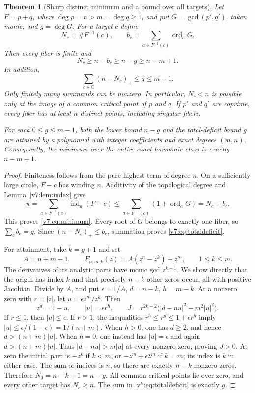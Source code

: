 \documentclass[UTF8,11pt]{ctexart}
\newtheorem{thm}{Theorem}[section]
\theoremstyle{definition}
\numberwithin{equation}{section}
\newcommand{\C}{\mathbb C}\newcommand{\R}{\mathbb R}
\DeclareMathOperator{\ord}{ord}\DeclareMathOperator{\Fix}{Fix}
\begin{document}
\begin{thm}[Sharp distinct minimum and a bound over all targets]
\label{v7:thm:minimum}
Let $F=p+\overline q$, where $\deg p=n>m=\deg q\ge1$, and put
$G=\gcd(p',q')$, taken monic, and $g=\deg G$. For a target $c$ define
\[
 N_c=\#F^{-1}(c),\qquad
 b_c=\sum_{a\in F^{-1}(c)}\ord_aG.
\]
Then every fiber is finite and
\begin{equation}\label{v7:eq:minimum}
 N_c\ge n-b_c\ge n-g\ge n-m+1.
\end{equation}
In addition,
\begin{equation}\label{v7:eq:totaldeficit}
 \sum_{c\in\C}(n-N_c)_+\le g\le m-1.
\end{equation}
Only finitely many summands can be nonzero. In particular,
$N_c<n$ is possible only at the image of a common critical point
of $p$ and $q$. If $p'$ and $q'$ are coprime, every fiber has
at least $n$ distinct points, including singular fibers.

For each $0\le g\le m-1$, both the lower bound $n-g$ and the
total-deficit bound $g$ are attained by a polynomial with integer
coefficients and exact degrees $(m,n)$. Consequently, the minimum
over the entire exact harmonic class is exactly $n-m+1$.
\end{thm}
\begin{proof}
Finiteness follows from the pure highest term of degree $n$.
On a sufficiently large circle, $F-c$ has winding $n$.
Additivity of the topological degree and Lemma~\ref{v7:lem:index}
give
\[
 n=\sum_{a\in F^{-1}(c)}\operatorname{ind}_a(F-c)
 \le\sum_{a\in F^{-1}(c)}(1+\ord_aG)=N_c+b_c.
\]
This proves \eqref{v7:eq:minimum}. Every root of $G$ belongs to
exactly one fiber, so $\sum_cb_c=g$. Since
$(n-N_c)_+\le b_c$, summation proves \eqref{v7:eq:totaldeficit}.

For attainment, take $k=g+1$ and set
\begin{equation}\label{v7:eq:integertrinomials}
 A=n+m+1,\qquad
 F_{n,m,k}(z)=A(z^n-z^k)+\bar z^m,
 \qquad 1\le k\le m.
\end{equation}
The derivatives of its analytic parts have monic gcd $z^{k-1}$.
We show directly that the origin has index $k$ and that precisely
$n-k$ other zeros occur, all with positive Jacobian.
Divide by $A$, and put $\epsilon=1/A$, $d=n-k$, $h=m-k$.
At a nonzero zero with $r=|z|$, let
$u=\epsilon\bar z^m/z^k$. Then
\[
 z^d=1-u,\qquad |u|=\epsilon r^h,\qquad
 J=r^{2k-2}\bigl(|d-nu|^2-m^2|u|^2\bigr).
\]
If $r\le1$, then $|u|\le\epsilon$. If $r>1$, the inequalities
$r^h\le r^d\le1+\epsilon r^h$ imply
$|u|\le\epsilon/(1-\epsilon)=1/(n+m)$.
When $h>0$, one has $d\ge2$, and hence
$d>(n+m)|u|$. When $h=0$, one instead has $|u|=\epsilon$
and again $d>(n+m)|u|$. Thus $|d-nu|>m|u|$ at every
nonzero zero, proving $J>0$.
At zero the initial part is $-z^k$ if $k<m$, or
$-z^m+\epsilon\bar z^m$ if $k=m$; its index is $k$ in either
case. The sum of indices is $n$, so there are exactly $n-k$
nonzero zeros. Therefore $N_0=n-k+1=n-g$.
All common critical points lie over zero, and every other target
has $N_c\ge n$. The sum in \eqref{v7:eq:totaldeficit} is exactly $g$.
\end{proof}
\end{document}
